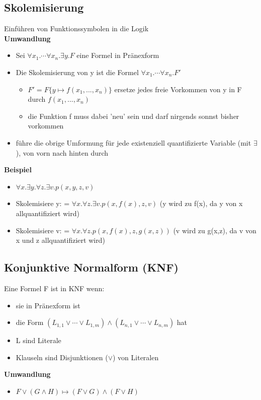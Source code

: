 \documentclass[12pt,a4paper]{article}
\begin{document}
\subsection{Skolemisierung}
Einführen von Funktionssymbolen in die Logik\\
\textbf{Umwandlung}
\begin{itemize}
\item Sei $\forall x_1.\cdots\forall x_n.\exists y.F$ eine Formel in Pränexform
\item Die Skolemisierung von y ist die Formel $\forall x_1.\cdots\forall x_n.F'$
\begin{itemize}
\item $F' = F\{y\mapsto f(x_1,...,x_n)\}$ ersetze jedes freie Vorkommen von y in F durch $f(x_1,...,x_n)$
\item die Funktion f muss dabei 'neu' sein und darf nirgends sonnst bisher vorkommen
\end{itemize}
\item führe die obrige Umformung für jede existenziell quantifizierte Variable (mit $\exists$), von vorn nach hinten durch
\end{itemize}
\textbf{Beispiel}
\begin{itemize}
\item $\forall x.\exists y. \forall z. \exists v.p(x,y,z,v)$
\item Skolemisiere y: = $\forall x.\forall z.\exists v.p(x,f(x),z,v)$ (y wird zu f(x), da y von x allquantifiziert wird)
\item Skolemisiere v: = $\forall x. \forall z.p(x,f(x),z,g(x,z))$ (v wird zu g(x,z), da v von x und z allquantifiziert wird)
\end{itemize}

\subsection{Konjunktive Normalform (KNF)}
Eine Formel F ist in KNF wenn:
\begin{itemize}
\item sie in Pränexform ist
\item die Form $(L_{1,1} \lor \cdots \lor L_{1,m}) \land (L_{n,1} \lor \cdots \lor L_{n,m})$ hat
\item L sind Literale
\item Klauseln sind Disjunktionen ($\lor$) von Literalen
\end{itemize}
\textbf{Umwandlung}
\begin{itemize}
\item $F \lor (G \land H) \mapsto (F\lor G) \land (F \lor H)$
\end{itemize}
\end{document}
